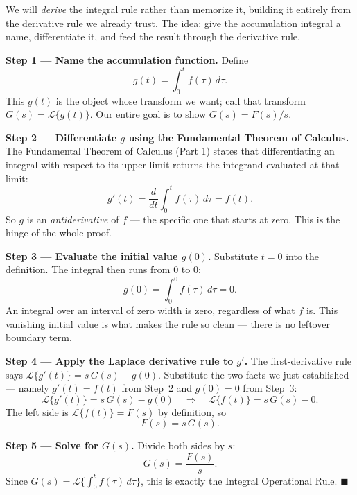 \documentclass[11pt]{article}
\begin{document}
\begin{methodbox}
We will \emph{derive} the integral rule rather than memorize it, building it entirely from the derivative rule we already trust. The idea: give the accumulation integral a name, differentiate it, and feed the result through the derivative rule.

\smallskip
\textbf{Step 1 --- Name the accumulation function.} Define
\[ g(t) = \int_0^t f(\tau)\,d\tau. \]
This $g(t)$ is the object whose transform we want; call that transform $G(s) = \mathcal{L}\{g(t)\}$. Our entire goal is to show $G(s) = F(s)/s$.

\smallskip
\textbf{Step 2 --- Differentiate $g$ using the Fundamental Theorem of Calculus.} The Fundamental Theorem of Calculus (Part 1) states that differentiating an integral with respect to its upper limit returns the integrand evaluated at that limit:
\[ g'(t) = \frac{d}{dt}\int_0^t f(\tau)\,d\tau = f(t). \]
So $g$ is an \emph{antiderivative} of $f$ --- the specific one that starts at zero. This is the hinge of the whole proof.

\smallskip
\textbf{Step 3 --- Evaluate the initial value $g(0)$.} Substitute $t = 0$ into the definition. The integral then runs from $0$ to $0$:
\[ g(0) = \int_0^0 f(\tau)\,d\tau = 0. \]
An integral over an interval of zero width is zero, regardless of what $f$ is. This vanishing initial value is what makes the rule so clean --- there is no leftover boundary term.

\smallskip
\textbf{Step 4 --- Apply the Laplace derivative rule to $g'$.} The first-derivative rule says $\mathcal{L}\{g'(t)\} = s\,G(s) - g(0)$. Substitute the two facts we just established --- namely $g'(t) = f(t)$ from Step~2 and $g(0) = 0$ from Step~3:
\[ \mathcal{L}\{g'(t)\} = s\,G(s) - g(0) \quad\Longrightarrow\quad \mathcal{L}\{f(t)\} = s\,G(s) - 0. \]
The left side is $\mathcal{L}\{f(t)\} = F(s)$ by definition, so
\[ F(s) = s\,G(s). \]

\smallskip
\textbf{Step 5 --- Solve for $G(s)$.} Divide both sides by $s$:
\[ G(s) = \frac{F(s)}{s}. \]
Since $G(s) = \mathcal{L}\{\int_0^t f(\tau)\,d\tau\}$, this is exactly the Integral Operational Rule. \qquad$\blacksquare$
\end{methodbox}
\end{document}
